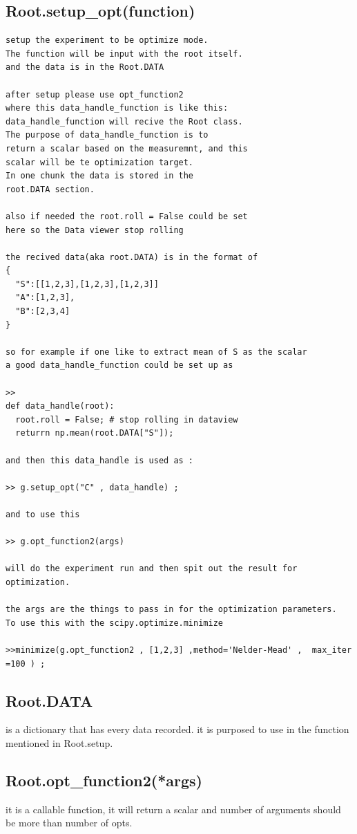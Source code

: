 \documentclass{article}
\begin{document}
\subsection{Root.setup\_opt(function)}
\begin{lstlisting}
setup the experiment to be optimize mode.
The function will be input with the root itself.
and the data is in the Root.DATA

after setup please use opt_function2    
where this data_handle_function is like this:
data_handle_function will recive the Root class.
The purpose of data_handle_function is to  
return a scalar based on the measuremnt, and this
scalar will be te optimization target.
In one chunk the data is stored in the 
root.DATA section.

also if needed the root.roll = False could be set 
here so the Data viewer stop rolling

the recived data(aka root.DATA) is in the format of 
{
  "S":[[1,2,3],[1,2,3],[1,2,3]]
  "A":[1,2,3],
  "B":[2,3,4]
}

so for example if one like to extract mean of S as the scalar
a good data_handle_function could be set up as 

>>  
def data_handle(root):
  root.roll = False; # stop rolling in dataview
  returrn np.mean(root.DATA["S"]);

and then this data_handle is used as : 

>> g.setup_opt("C" , data_handle) ;

and to use this 

>> g.opt_function2(args) 

will do the experiment run and then spit out the result for
optimization.

the args are the things to pass in for the optimization parameters.
To use this with the scipy.optimize.minimize

>>minimize(g.opt_function2 , [1,2,3] ,method='Nelder-Mead' ,  max_iter =100 ) ;

\end{lstlisting}
\subsection{Root.DATA}
is a dictionary that has every data recorded.
it is purposed to use in the function mentioned in Root.setup.

\subsection{Root.opt\_function2(*args)}
it is a callable function, it will return a scalar
and number of arguments should be more than number of opts.
\end{document}
